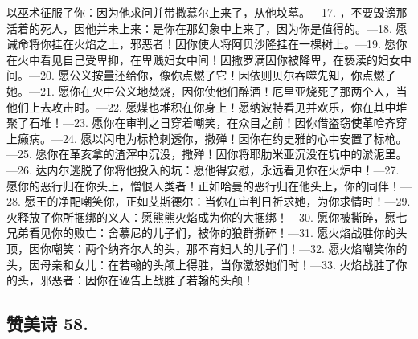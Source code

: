 以巫术征服了你：因为他求问并带撒慕尔上来了，从他坟墓。—\newline{}17. ，不要毁谤那活着的死人，因他并未上来：是你在那幻象中上来了，因为你是值得的。—\newline{}18. 愿诫命将你挂在火焰之上，邪恶者！因你使人将阿贝沙隆挂在一棵树上。—\newline{}19. 愿你在火中看见自己受卑抑，在卑贱妇女中间！因撒罗满因你被降卑，在亵渎的妇女中间。—\newline{}20. 愿公义按量还给你，像你点燃了它！因依则贝尔吞噬先知，你点燃了她。—\newline{}21. 愿你在火中公义地焚烧，因你使他们醉酒！厄里亚烧死了那两个人，当他们上去攻击时。—\newline{}22. 愿煤也堆积在你身上！愿纳波特看见并欢乐，你在其中堆聚了石堆！—\newline{}23. 愿你在审判之日穿着嘲笑，在众目之前！因你借盗窃使革哈齐穿上癞病。—\newline{}24. 愿以闪电为标枪刺透你，撒殚！因你在约史雅的心中安置了标枪。—\newline{}25. 愿你在革亥拿的渣滓中沉没，撒殚！因你将耶肋米亚沉没在坑中的淤泥里。—\newline{}26. 达内尔逃脱了你将他投入的坑：愿他得安慰，永远看见你在火炉中！—\newline{}27. 愿你的恶行归在你头上，憎恨人类者！正如哈曼的恶行归在他头上，你的同伴！—\newline{}28. 愿王的净配嘲笑你，正如艾斯德尔：当你在审判日祈求她，为你求情时！—\newline{}29. 火释放了你所捆绑的义人：愿熊熊火焰成为你的大捆绑！—\newline{}30. 愿你被撕碎，愿七兄弟看见你的败亡：舍慕尼的儿子们，被你的狼群撕碎！—\newline{}31. 愿火焰战胜你的头顶，因你嘲笑：两个纳齐尔人的头，那不育妇人的儿子们！—\newline{}32. 愿火焰嘲笑你的头，因母亲和女儿：在若翰的头颅上得胜，当你激怒她们时！—\newline{}33. 火焰战胜了你的头，邪恶者：因你在诬告上战胜了若翰的头颅！\par


\subsection{赞美诗 58.}

